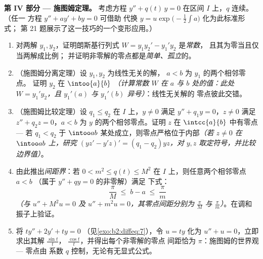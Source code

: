 \begin{problem}
\medskip
\noindent\textbf{第 IV 部分 --- 施图姆定理。} 考虑方程 $y''
+ q(t)\,y = 0$ 在区间 $I$ 上，$q$ 连续。（任一
方程 $y'' + ay' + by = 0$ 可借助
代换 $y = u\exp\bigl(-\frac12\int a\bigr)$ 化为此标准形式；
第 21 题展示了这一技巧的一个变形应用。）
\begin{enumerate}[resume]
  \item 对两解 $y_1, y_2$，证明朗斯基行列式
        $W = y_1y_2' - y_1'y_2$ 是\emph{常数}，
        且其为零当且仅当两解成比例；
        并证明非零解的零点都是\emph{简单、孤立}的。
  \item （施图姆分离定理）设 $y_1, y_2$ 为线性无关的解，
        $a < b$ 为 $y_1$ 的两个相邻零点。
        证明 $y_2$ 在
        $\intoo{a}{b}$ \emph{（计算常数 $W$ 在 $a$
        与 $b$ 处的值：此处 $W = y_1'y_2$，且 $y_1'(a)$
        与 $y_1'(b)$ 异号）}：线性无关解的
        零点彼此交错。
  \item （施图姆比较定理）设 $q_1 \leq q_2$ 在 $I$ 上，$y \neq
        0$ 满足 $y'' + q_1y = 0$，$z \neq 0$ 满足 $z'' + q_2z
        = 0$，$a < b$ 为 $y$ 的两个相邻零点。证明
        $z$ 在 $\intcc{a}{b}$ 中有零点 --- 若
        $q_1 < q_2$ 于 $\intoo ab$ 某处成立，则零点严格位于内部\emph{（若 $z \neq
        0$ 在 $\intoo ab$ 上，研究 $(yz' - y'z)' = (q_1 -
        q_2)yz$，对 $y, z$ 取定符号，并比较
        边界值）}。
  \item 由此推出\emph{间距界}：若 $0 < m^2 \leq
        q(t) \leq M^2$ 在 $I$ 上，则任意两个相邻零点
        $a < b$ （属于 $y'' + qy = 0$ 的非零解）满足
        下式：
        \[
        \frac{\pi}{M} \;\leq\; b - a \;\leq\; \frac{\pi}{m}
        \]
        \emph{（与 $u'' + M^2u = 0$ 及 $u'' + m^2u
        = 0$，其零点间距分别为 $\frac\pi M$ 与
        $\frac\pi m$）}。在调和振子上验证。
  \item 将 $ty'' + 2y' + ty = 0$
        （见\cref{exo:b2:diffeq:7}），令 $u = ty$ 化为 $u'' + u =
        0$，立即求出其解 $\frac{\sin t}t$，
        $\frac{\cos t}{t}$，并得出每个非零解的零点
        间距恰为
        $\pi$：施图姆的世界观 --- 零点由
        系数 $q$ 控制，无论有无显式公式。
\end{enumerate}


\end{problem}
